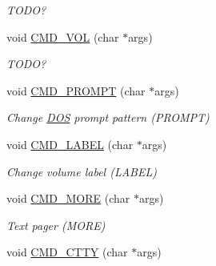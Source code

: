 \begin{DoxyCompactItemize}
\begin{DoxyCompactList}\small\item\em T\-O\-D\-O? \end{DoxyCompactList}\item 
\hypertarget{classDOS__Shell_ad4529bb89fb7c10cc6e98cde3b84f876}{void \hyperlink{classDOS__Shell_ad4529bb89fb7c10cc6e98cde3b84f876}{C\-M\-D\-\_\-\-V\-O\-L} (char $\ast$args)}\label{classDOS__Shell_ad4529bb89fb7c10cc6e98cde3b84f876}

\begin{DoxyCompactList}\small\item\em T\-O\-D\-O? \end{DoxyCompactList}\item 
\hypertarget{classDOS__Shell_a11b29015ed77577516d699150068d3fe}{void \hyperlink{classDOS__Shell_a11b29015ed77577516d699150068d3fe}{C\-M\-D\-\_\-\-P\-R\-O\-M\-P\-T} (char $\ast$args)}\label{classDOS__Shell_a11b29015ed77577516d699150068d3fe}

\begin{DoxyCompactList}\small\item\em Change \hyperlink{classDOS}{D\-O\-S} prompt pattern (P\-R\-O\-M\-P\-T) \end{DoxyCompactList}\item 
\hypertarget{classDOS__Shell_adcca6e4501250456d1a04a9eac322be6}{void \hyperlink{classDOS__Shell_adcca6e4501250456d1a04a9eac322be6}{C\-M\-D\-\_\-\-L\-A\-B\-E\-L} (char $\ast$args)}\label{classDOS__Shell_adcca6e4501250456d1a04a9eac322be6}

\begin{DoxyCompactList}\small\item\em Change volume label (L\-A\-B\-E\-L) \end{DoxyCompactList}\item 
\hypertarget{classDOS__Shell_a31d3f8107e9fc6bf368b02f5b15c861e}{void \hyperlink{classDOS__Shell_a31d3f8107e9fc6bf368b02f5b15c861e}{C\-M\-D\-\_\-\-M\-O\-R\-E} (char $\ast$args)}\label{classDOS__Shell_a31d3f8107e9fc6bf368b02f5b15c861e}

\begin{DoxyCompactList}\small\item\em Text pager (M\-O\-R\-E) \end{DoxyCompactList}\item 
\hypertarget{classDOS__Shell_ab4e4f875c54408e1c040ee0aa65b5314}{void \hyperlink{classDOS__Shell_ab4e4f875c54408e1c040ee0aa65b5314}{C\-M\-D\-\_\-\-C\-T\-T\-Y} (char $\ast$args)}\label{classDOS__Shell_ab4e4f875c54408e1c040ee0aa65b5314}


\end{DoxyCompactItemize}
